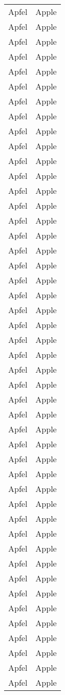 \documentclass{article}
\begin{document}
\begin{center}
\begin{longtable}{|m{5cm}|m{5cm}|}
			Apfel& Apple\\
			Apfel& Apple\\
			Apfel& Apple\\
			Apfel& Apple\\
			Apfel& Apple\\
			Apfel& Apple\\
			Apfel& Apple\\
			Apfel& Apple\\
			Apfel& Apple\\
			Apfel& Apple\\
			Apfel& Apple\\
			Apfel& Apple\\
			Apfel& Apple\\
			Apfel& Apple\\
			Apfel& Apple\\
			Apfel& Apple\\
			Apfel& Apple\\
			Apfel& Apple\\
			Apfel& Apple\\
			Apfel& Apple\\
			Apfel& Apple\\
			Apfel& Apple\\
			Apfel& Apple\\
			Apfel& Apple\\
			Apfel& Apple\\
			Apfel& Apple\\
			Apfel& Apple\\
			Apfel& Apple\\
			Apfel& Apple\\
			Apfel& Apple\\
			Apfel& Apple\\
			Apfel& Apple\\
			Apfel& Apple\\
			Apfel& Apple\\
			Apfel& Apple\\
			Apfel& Apple\\
			Apfel& Apple\\
			Apfel& Apple\\
			Apfel& Apple\\
			Apfel& Apple\\
			Apfel& Apple\\
			Apfel& Apple\\
			Apfel& Apple\\
			Apfel& Apple\\
			Apfel& Apple\\
			Apfel& Apple\\
		\end{longtable}
\label{tab:A}	
\end{center}
\end{document}
